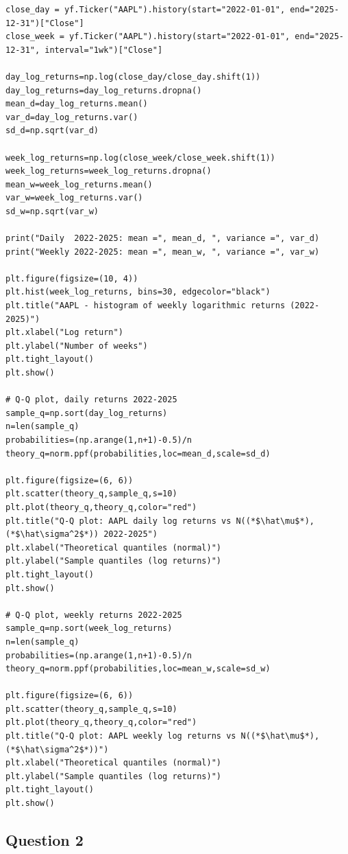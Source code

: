 \documentclass[11pt,a4paper]{article}
\begin{document}
\begin{lstlisting}[caption={Q1b: daily and weekly log returns 2022--2025, statistics and Q-Q plots.}, label={lst:q1b-weekly}]
close_day = yf.Ticker("AAPL").history(start="2022-01-01", end="2025-12-31")["Close"]
close_week = yf.Ticker("AAPL").history(start="2022-01-01", end="2025-12-31", interval="1wk")["Close"]

day_log_returns=np.log(close_day/close_day.shift(1))
day_log_returns=day_log_returns.dropna()
mean_d=day_log_returns.mean()
var_d=day_log_returns.var()
sd_d=np.sqrt(var_d)

week_log_returns=np.log(close_week/close_week.shift(1))
week_log_returns=week_log_returns.dropna()
mean_w=week_log_returns.mean()
var_w=week_log_returns.var()
sd_w=np.sqrt(var_w)

print("Daily  2022-2025: mean =", mean_d, ", variance =", var_d)
print("Weekly 2022-2025: mean =", mean_w, ", variance =", var_w)

plt.figure(figsize=(10, 4))
plt.hist(week_log_returns, bins=30, edgecolor="black")
plt.title("AAPL - histogram of weekly logarithmic returns (2022-2025)")
plt.xlabel("Log return")
plt.ylabel("Number of weeks")
plt.tight_layout()
plt.show()

# Q-Q plot, daily returns 2022-2025
sample_q=np.sort(day_log_returns)
n=len(sample_q)
probabilities=(np.arange(1,n+1)-0.5)/n
theory_q=norm.ppf(probabilities,loc=mean_d,scale=sd_d)

plt.figure(figsize=(6, 6))
plt.scatter(theory_q,sample_q,s=10)
plt.plot(theory_q,theory_q,color="red")
plt.title("Q-Q plot: AAPL daily log returns vs N((*$\hat\mu$*), (*$\hat\sigma^2$*)) 2022-2025")
plt.xlabel("Theoretical quantiles (normal)")
plt.ylabel("Sample quantiles (log returns)")
plt.tight_layout()
plt.show()

# Q-Q plot, weekly returns 2022-2025
sample_q=np.sort(week_log_returns)
n=len(sample_q)
probabilities=(np.arange(1,n+1)-0.5)/n
theory_q=norm.ppf(probabilities,loc=mean_w,scale=sd_w)

plt.figure(figsize=(6, 6))
plt.scatter(theory_q,sample_q,s=10)
plt.plot(theory_q,theory_q,color="red")
plt.title("Q-Q plot: AAPL weekly log returns vs N((*$\hat\mu$*), (*$\hat\sigma^2$*))")
plt.xlabel("Theoretical quantiles (normal)")
plt.ylabel("Sample quantiles (log returns)")
plt.tight_layout()
plt.show()
\end{lstlisting}

\subsection{Question 2}
\end{document}

